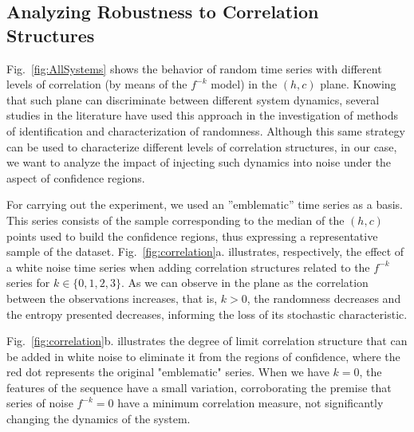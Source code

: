 \subsection{Analyzing Robustness to Correlation Structures}

Fig.~\ref{fig:AllSystems} shows the behavior of random time series with different levels of correlation (by means of the $f^{-k}$ model) in the $(h,c)$ plane.
Knowing that such plane can discriminate between different system dynamics, several studies in the literature have used this approach in the investigation of methods of identification and characterization of randomness.
Although this same strategy can be used to characterize different levels of correlation structures, in our case, we want to analyze the impact of injecting such dynamics into noise under the aspect of confidence regions.

For carrying out the experiment, we used an ''emblematic'' time series as a basis.
This series consists of the sample corresponding to the median of the $(h,c)$ points used to build the confidence regions, thus expressing a representative sample of the dataset.
Fig.~\ref{fig:correlation}a. illustrates, respectively, the effect of a white noise time series when adding correlation structures related to the $f^{-k}$ series for $k \in \{0, 1, 2, 3 \}$.
As we can observe in the plane as the correlation between the observations increases, that is, $k > 0$, the randomness decreases and the entropy presented decreases, informing the loss of its stochastic characteristic.

Fig.~\ref{fig:correlation}b. illustrates the degree of limit correlation structure that can be added in white noise to eliminate it from the regions of confidence, where the red dot represents the original "emblematic" series.
When we have $k = 0$, the features of the sequence have a small variation, corroborating the premise that series of noise $f^{-k} = 0$ have a minimum correlation measure, not significantly changing the dynamics of the system.

